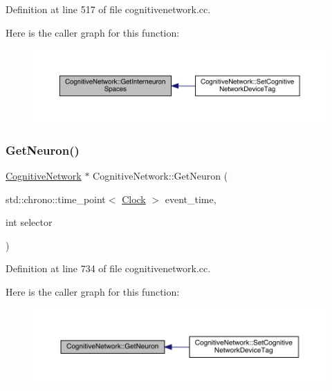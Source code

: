 Definition at line 517 of file cognitivenetwork.\+cc.

Here is the caller graph for this function\+:
\nopagebreak
\begin{figure}[H]
\begin{center}
\leavevmode
\includegraphics[width=350pt]{class_cognitive_network_a4daf966882d527b784bd359794ad39ca_icgraph}
\end{center}
\end{figure}
\mbox{\label{class_cognitive_network_ac12f0af92d878d45dca7303dc065c383}} 
\subsubsection{\texorpdfstring{Get\+Neuron()}{GetNeuron()}}
{\footnotesize\ttfamily \hyperlink{class_cognitive_network}{Cognitive\+Network} $\ast$ Cognitive\+Network\+::\+Get\+Neuron (\begin{DoxyParamCaption}\item[{std\+::chrono\+::time\+\_\+point$<$ \hyperlink{universe_8h_a0ef8d951d1ca5ab3cfaf7ab4c7a6fd80}{Clock} $>$}]{event\+\_\+time,  }\item[{int}]{selector }\end{DoxyParamCaption})}



Definition at line 734 of file cognitivenetwork.\+cc.

Here is the caller graph for this function\+:
\nopagebreak
\begin{figure}[H]
\begin{center}
\leavevmode
\includegraphics[width=350pt]{class_cognitive_network_ac12f0af92d878d45dca7303dc065c383_icgraph}
\end{center}
\end{figure}
\mbox{\label{class_cognitive_network_af81132245e486c496a055f54a5a520d0}} 
